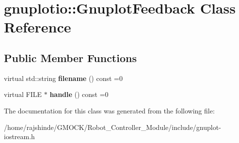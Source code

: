 \hypertarget{classgnuplotio_1_1_gnuplot_feedback}{}\section{gnuplotio\+:\+:Gnuplot\+Feedback Class Reference}
\label{classgnuplotio_1_1_gnuplot_feedback}
\subsection*{Public Member Functions}
\begin{DoxyCompactItemize}
\item 
virtual std\+::string {\bfseries filename} () const =0\hypertarget{classgnuplotio_1_1_gnuplot_feedback_a081d4d59ffd81e2322c07c0a802e1307}{}\label{classgnuplotio_1_1_gnuplot_feedback_a081d4d59ffd81e2322c07c0a802e1307}

\item 
virtual F\+I\+LE $\ast$ {\bfseries handle} () const =0\hypertarget{classgnuplotio_1_1_gnuplot_feedback_a13ae87ba489bfbe87f64b8b54e8a4563}{}\label{classgnuplotio_1_1_gnuplot_feedback_a13ae87ba489bfbe87f64b8b54e8a4563}

\end{DoxyCompactItemize}


The documentation for this class was generated from the following file\+:\begin{DoxyCompactItemize}
\item 
/home/rajshinde/\+G\+M\+O\+C\+K/\+Robot\+\_\+\+Controller\+\_\+\+Module/include/gnuplot-\/iostream.\+h\end{DoxyCompactItemize}
